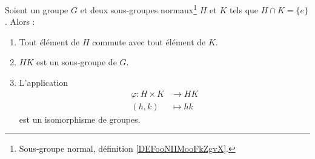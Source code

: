 \begin{lemma}\label{LemHUkMxp}
	Soient un groupe \( G\) et deux sous-groupes normaux\footnote{Sous-groupe normal, définition \ref{DEFooNIIMooFkZgvX}.} \( H\) et \( K\) tels que \( H\cap K=\{ e \}\). Alors :
	\begin{enumerate}
		\item       \label{ITEMooDFVBooSnnlgR}
		      Tout élément de \( H\) commute avec tout élément de \( K\).
		\item       \label{ITEMooVVBGooZSJqjp}
		      \( HK\) est un sous-groupe de \( G\).
		\item       \label{IMTEooPCBZooQoZFOD}
		      L'application
		      \begin{equation}
			      \begin{aligned}
				      \varphi\colon H\times K & \to HK     \\
				      (h,k)                   & \mapsto hk
			      \end{aligned}
		      \end{equation}
		      est un isomorphisme de groupes.
	\end{enumerate}
\end{lemma}

